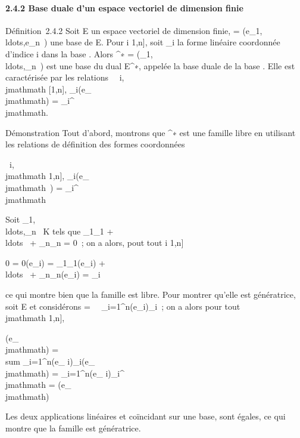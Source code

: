 \documentclass[]{article}
\begin{document}
\paragraph{2.4.2 Base duale d'un espace vectoriel de dimension finie}

Définition~2.4.2 Soit E un espace vectoriel de dimension finie,  =
(e_1,\\ldots,e_n~)
une base de E. Pour i \in {[}1,n{]}, soit \phi_i la forme linéaire
coordonnée d'indice i dans la base . Alors ^∗ =
(\phi_1,\\ldots,\phi_n~)
est une base du dual E^∗, appelée la base duale de la base .
Elle est caractérisée par les relations \forall~~i,\\jmathmath \in
{[}1,n{]}, \phi_i(e_\\jmathmath) = \delta_i^\\jmathmath.

Démonstration Tout d'abord, montrons que ^∗ est une famille
libre en utilisant les relations de définition des formes coordonnées

\forall~i,\\jmathmath \in {[}1,n{]}, \phi_i(e_\\jmathmath~) =
\delta_i^\\jmathmath

Soit
\lambda_1,\\ldots,\lambda_n~
\in K tels que \lambda_1\phi_1 +
\\ldots~ +
\lambda_n\phi_n = 0~; on a alors, pout tout i \in {[}1,n{]}

0 = 0(e_i) = \lambda_1\phi_1(e_i) +
\\ldots~ +
\lambda_n\phi_n(e_i) = \lambda_i

ce qui montre bien que la famille est libre. Pour montrer qu'elle est
génératrice, soit \phi \in E et considérons \psi =\
\sum ~
_i=1^n\phi(e_i)\phi_i~; on a alors pour tout \\jmathmath
\in {[}1,n{]},

\psi(e_\\jmathmath) = \\sum
_i=1^n\phi(e_ i)\phi_i(e_\\jmathmath) =
\sum _i=1^n\phi(e_
i)\delta_i^\\jmathmath = \phi(e_ \\jmathmath)

Les deux applications linéaires \phi et \psi coïncidant sur une base, sont
égales, ce qui montre que la famille est génératrice.
\end{document}
